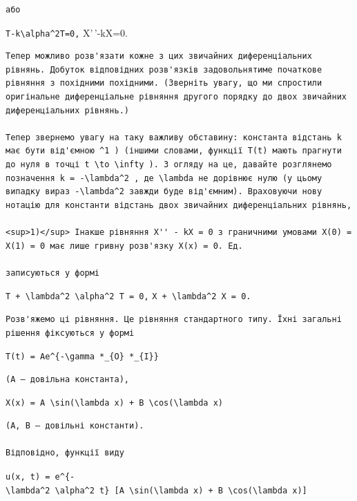 \documentclass[
  ukrainian,
]{article}
\begin{document}
\begin{verbatim}
або
\end{verbatim}

\texttt{T\textquotesingle{}-k\textbackslash{}alpha\^{}2T=0,} X'\,'-kX=0.

\begin{verbatim}
Тепер можливо розв'язати кожне з цих звичайних диференціальних рівнянь. Добуток відповідних розв'язків задовольнятиме початкове рівняння з похідними похідними. (Зверніть увагу, що ми спростили оригінальне диференціальне рівняння другого порядку до двох звичайних диференціальних рівнянь.)

Тепер звернемо увагу на таку важливу обставину: константа відстань k має бути від'ємною ^1 ) (іншими словами, функції T(t) мають прагнути до нуля в точці t \to \infty ). З огляду на це, давайте розглянемо позначення k = -\lambda^2 , де \lambda не дорівнює нулю (у цьому випадку вираз -\lambda^2 завжди буде від'ємним). Враховуючи нову нотацію для константи відстань двох звичайних диференціальних рівнянь,

<sup>1)</sup> Інакше рівняння X'' - kX = 0 з граничними умовами X(0) = X(1) = 0 має лише гривну розв'язку X(x) = 0. Ед.

записуються у формі
\end{verbatim}

\texttt{T\textquotesingle{}\ +\ \textbackslash{}lambda\^{}2\ \textbackslash{}alpha\^{}2\ T\ =\ 0,}
\texttt{X\textquotesingle{}\textquotesingle{}\ +\ \textbackslash{}lambda\^{}2\ X\ =\ 0.}

\begin{verbatim}
Розв'яжемо ці рівняння. Це рівняння стандартного типу. Їхні загальні рішення фіксуються у формі
\end{verbatim}

\texttt{T(t)\ =\ Ae\^{}\{-\textbackslash{}gamma\ *\_\{O\}\ *\_\{I\}\}}

\begin{verbatim}
(A — довільна константа),
\end{verbatim}

\texttt{X(x)\ =\ A\ \textbackslash{}sin(\textbackslash{}lambda\ x)\ +\ B\ \textbackslash{}cos(\textbackslash{}lambda\ x)}

\begin{verbatim}
(A, B — довільні константи).

Відповідно, функції виду
\end{verbatim}

\texttt{u(x,\ t)\ =\ e\^{}\{-\textbackslash{}lambda\^{}2\ \textbackslash{}alpha\^{}2\ t\}\ {[}A\ \textbackslash{}sin(\textbackslash{}lambda\ x)\ +\ B\ \textbackslash{}cos(\textbackslash{}lambda\ x){]}}
\end{document}
